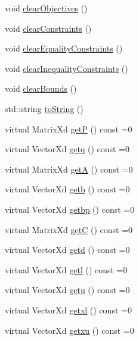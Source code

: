 {\bf }\par
\begin{DoxyCompactItemize}
\item 
void \hyperlink{classocra_1_1QuadraticSolver_a0339ac8b860591dea7f24bc05d58fdf0}{clear\+Objectives} ()
\item 
void \hyperlink{classocra_1_1QuadraticSolver_a0799e2cf2d10be123e5dcdf43e1fcaba}{clear\+Constraints} ()
\item 
void \hyperlink{classocra_1_1QuadraticSolver_a5e9a6e51657e775ab6619e86814982cc}{clear\+Equality\+Constraints} ()
\item 
void \hyperlink{classocra_1_1QuadraticSolver_ac41ecf476cf2bbe6ce17e3520e44f138}{clear\+Inequality\+Constraints} ()
\item 
void \hyperlink{classocra_1_1QuadraticSolver_ab95c9570c859ca0d1ff2ea5f1c6efd44}{clear\+Bounds} ()
\end{DoxyCompactItemize}

{\bf }\par
\begin{DoxyCompactItemize}
\item 
std\+::string \hyperlink{classocra_1_1QuadraticSolver_a1f4efd162b95e7688d0720805fb94445}{to\+String} ()
\item 
virtual Matrix\+Xd \hyperlink{classocra_1_1QuadraticSolver_a4dcc2768227c21262571d19c0d494935}{getP} () const =0
\item 
virtual Vector\+Xd \hyperlink{classocra_1_1QuadraticSolver_a2a907a3fc7c60a7bf9e6a3403c544dcc}{getq} () const =0
\item 
virtual Matrix\+Xd \hyperlink{classocra_1_1QuadraticSolver_aa3904e85d74c7c88c3605a082741b8cd}{getA} () const =0
\item 
virtual Vector\+Xd \hyperlink{classocra_1_1QuadraticSolver_ac051c6a779ce6a6e6e6657cfd3e1f65f}{getb} () const =0
\item 
virtual Vector\+Xd \hyperlink{classocra_1_1QuadraticSolver_af5cc64ada014e8caf3d2c994eaa1c48a}{getbp} () const =0
\item 
virtual Matrix\+Xd \hyperlink{classocra_1_1QuadraticSolver_a0babcde3ffe8770131b5f842da01c49c}{getC} () const =0
\item 
virtual Vector\+Xd \hyperlink{classocra_1_1QuadraticSolver_a7f15d5d3c28feac3204542c885d68586}{getd} () const =0
\item 
virtual Vector\+Xd \hyperlink{classocra_1_1QuadraticSolver_a13e3a471615ca667daadf490dedc18eb}{getl} () const =0
\item 
virtual Vector\+Xd \hyperlink{classocra_1_1QuadraticSolver_a6d5040842f155042064a33939aa60385}{getu} () const =0
\item 
virtual Vector\+Xd \hyperlink{classocra_1_1QuadraticSolver_a9c8270a0e1a921641884586ff448392b}{getxl} () const =0
\item 
virtual Vector\+Xd \hyperlink{classocra_1_1QuadraticSolver_a58cb3039938bc2a6c9c0e1042425a98b}{getxu} () const =0
\end{DoxyCompactItemize}

